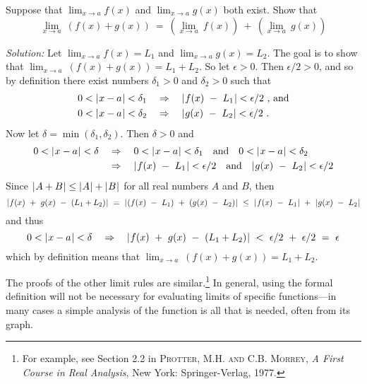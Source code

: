 \begin{exmp}\label{exmp:limsum}
 Suppose that $\displaystyle\lim_{x \to a} f(x)$ and
 $\displaystyle\lim_{x \to a} g(x)$ both exist. Show that
 \[
 \lim_{x \to a} ~(f(x) + g(x)) ~=~
  \left(\lim_{x \to a} ~f(x)\right) ~+~
  \left(\lim_{x \to a} ~g(x)\right)
\]
\par\noindent\emph{Solution:} Let $\displaystyle\lim_{x \to a} f(x) = L_1$ and
$\displaystyle\lim_{x \to a} g(x) = L_2$. The goal is to show that
$\displaystyle\lim_{x \to a} ~(f(x) + g(x)) = L_1 + L_2$. So let $\epsilon > 0$.
Then $\epsilon/2 > 0$, and so by definition there exist numbers
$\delta_1 > 0$ and $\delta_2 > 0$ such that
\begin{align*}
 0 < \lvert\mspace{1mu}x - a\mspace{1mu}\rvert < \delta_1 \quad&\Rightarrow\quad \lvert\mspace{1mu}f(x) ~-~ L_1\mspace{1mu}\rvert < \epsilon/2~\text{, and}\\
 0 < \lvert\mspace{1mu}x - a\mspace{1mu}\rvert < \delta_2 \quad&\Rightarrow\quad \lvert\mspace{1mu}g(x) ~-~ L_2\mspace{1mu}\rvert < \epsilon/2 ~.
\end{align*}
Now let $\delta = \min(\delta_1, \delta_2)$. Then $\delta > 0$ and
\begin{align*}
 0 < \lvert\mspace{1mu}x - a\mspace{1mu}\rvert < \delta \quad&\Rightarrow\quad
 0 < \lvert\mspace{1mu}x - a\mspace{1mu}\rvert < \delta_1 \quad\text{and}\quad 0 < \lvert\mspace{1mu}x - a\mspace{1mu}\rvert < \delta_2\\
 &\Rightarrow\quad \lvert\mspace{1mu}f(x) ~-~ L_1\mspace{1mu}\rvert < \epsilon/2 \quad\text{and}\quad
  \lvert\mspace{1mu}g(x) ~-~ L_2\mspace{1mu}\rvert < \epsilon/2
\end{align*}
Since $\lvert\mspace{1mu}A+B\mspace{1mu}\rvert \le \lvert\mspace{1mu}A\mspace{1mu}\rvert + \lvert\mspace{1mu}B\mspace{1mu}\rvert$ for all real numbers $A$ and $B$, then
\[
 \lvert\mspace{1mu}f(x) ~+~ g(x) ~-~ (L_1 + L_2)\mspace{1mu}\rvert ~=~
  \lvert\mspace{1mu}(f(x) ~-~ L_1) ~+~ (g(x) ~-~ L_2)\mspace{1mu}\rvert ~\le~
  \lvert\mspace{1mu}f(x) ~-~ L_1\mspace{1mu}\rvert ~+~ \lvert\mspace{1mu}g(x) ~-~ L_2\mspace{1mu}\rvert
\]
and thus
\[
 0 < \lvert\mspace{1mu}x-a\mspace{1mu}\rvert < \delta \quad\Rightarrow\quad
 \lvert\mspace{1mu}f(x) ~+~ g(x) ~-~ (L_1 + L_2)\mspace{1mu}\rvert ~<~ \epsilon/2 ~+~ \epsilon/2 ~=~ \epsilon
\]
which by definition means that $\displaystyle\lim_{x \to a} ~(f(x) + g(x)) = L_1 + L_2$.
\quad\checkmark
\end{exmp}
\divider
\newpage
The proofs of the other limit rules are similar.\footnote{For example, see
Section 2.2 in \textsc{Protter, M.H. and C.B. Morrey}, \emph{A First Course in
Real Analysis}, New York: Springer-Verlag, 1977.} In general, using the formal
definition will not be necessary for evaluating limits of specific
functions---in many cases a simple analysis of the function is all that is
needed, often from its graph.

